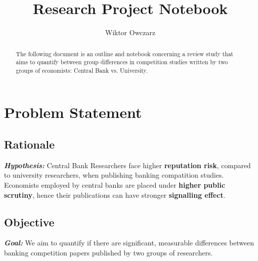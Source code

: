 \documentclass{article}
\title{\vspace{-2.5cm} \textbf{Research Project Notebook}}
\author{Wiktor Owczarz}
\begin{document}
\maketitle

\begin{minipage}{0.8\textwidth}
\begin{abstract}
   The following document is an outline and notebook concerning a review study that aims to quantify between group differences in competition studies written by two groups of economists: Central Bank  vs. University.
\end{abstract}
\end{minipage}

\section{Problem Statement}

\subsection*{Rationale}

\textbf{\textit{Hypothesis:}} Central Bank Researchers face higher \textbf{reputation risk}, compared to university researchers, when publishing banking compatition studies. Economists employed by central banks are placed under \textbf{higher public scrutiny}, hence their publications can have stronger \textbf{signalling effect}.


\subsection*{Objective}
\textbf{\textit{Goal:}} We aim to quantify if there are significant, measurable differences between banking competition papers published by two groups of researchers. \\
\end{document}
